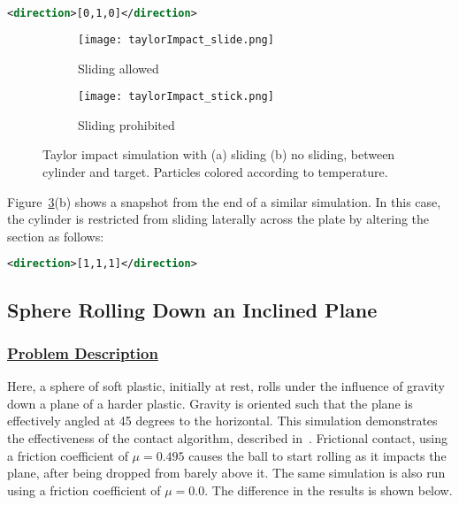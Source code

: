 \begin{lstlisting}[language=XML]
        <direction>[0,1,0]</direction>
\end{lstlisting}

\begin{figure}
  \centering
  \begin{subfigure}{0.4\textwidth}
    \centering
    \texttt{[image: taylorImpact\_slide.png]}
    \label{fig:taylorImpact_slide}
    \caption{Sliding allowed}
  \end{subfigure}
  \begin{subfigure}{0.4\textwidth}
    \centering
    \texttt{[image: taylorImpact\_stick.png]}
    \label{fig:taylorImpact_stick}
    \caption{Sliding prohibited}
  \end{subfigure}
  \caption{Taylor impact simulation with (a) sliding (b) no sliding,
           between cylinder and
           target.  Particles colored according to temperature.}
  \label{fig:taylorImpact}
\end{figure}

Figure~\ref{fig:taylorImpact}(b) shows a snapshot from the end of a
similar simulation.  In this case, the cylinder is restricted from sliding
laterally across the plate by altering the 
section as follows:
\begin{lstlisting}[language=XML]
        <direction>[1,1,1]</direction>
\end{lstlisting}

\newpage
\subsection*{\center Sphere Rolling Down an Inclined Plane}
\subsubsection*{\underline{Problem Description}}
Here, a sphere of soft plastic, initially at rest, rolls under the
influence of gravity down a plane of a harder plastic.  Gravity is
oriented such that the plane is effectively angled at 45 degrees to
the horizontal.  This simulation demonstrates the effectiveness of
the contact algorithm, described in~\cite{Bard2001}.  Frictional
contact, using a friction coefficient of $\mu = 0.495$ causes the ball
to start rolling as it impacts the plane, after being dropped from
barely above it.  The same simulation is also run using a friction
coefficient of $\mu = 0.0$.  The difference in the results is shown
below.
 
